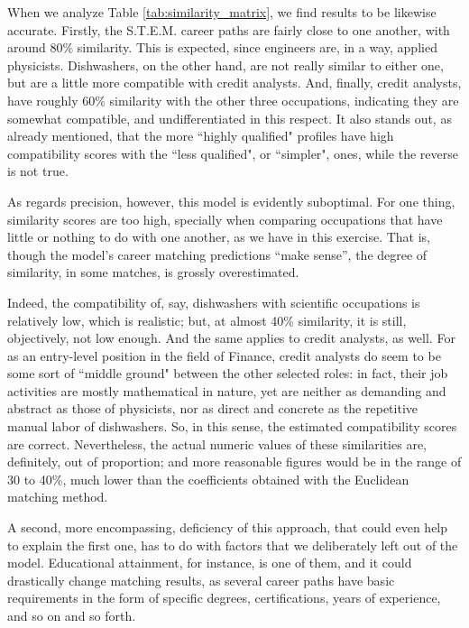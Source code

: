 \documentclass{article}
\begin{document}
When we analyze Table \ref{tab:similarity_matrix}, we find results to be
likewise accurate. Firstly, the S.T.E.M. career paths are fairly close to one
another, with around 80\% similarity. This is expected, since engineers are, in
a way, applied physicists. Dishwashers, on the other hand, are not really
similar to either one, but are a little more compatible with credit analysts.
And, finally, credit analysts, have roughly 60\% similarity with the other
three occupations, indicating they are somewhat compatible, and
undifferentiated in this respect. It also stands out, as already mentioned,
that the more ``highly qualified" profiles have high compatibility scores with
the ``less qualified", or ``simpler", ones, while the reverse is not true.

As regards precision, however, this model is evidently suboptimal. For one
thing, similarity scores are too high, specially when comparing occupations
that have little or nothing to do with one another, as we have in this
exercise. That is, though the model's career matching predictions ``make
sense'', the degree of similarity, in some matches, is grossly overestimated.

Indeed, the compatibility of, say, dishwashers with scientific occupations is
relatively low, which is realistic; but, at almost 40\% similarity, it is
still, objectively, not low enough. And the same applies to credit analysts, as
well. For as an entry-level position in the field of Finance, credit analysts
do seem to be some sort of ``middle ground" between the other selected roles:
in fact, their job activities are mostly mathematical in nature, yet are
neither as demanding and abstract as those of physicists, nor as direct and
concrete as the repetitive manual labor of dishwashers. So, in this sense, the
estimated compatibility scores are correct. Nevertheless, the actual numeric
values of these similarities are, definitely, out of proportion; and more
reasonable figures would be in the range of 30 to 40\%, much lower than the
coefficients obtained with the Euclidean matching method.

A second, more encompassing, deficiency of this approach, that could even help
to explain the first one, has to do with factors that we deliberately left out
of the model. Educational attainment, for instance, is one of them, and it
could drastically change matching results, as several career paths have basic
requirements in the form of specific degrees, certifications, years of
experience, and so on and so forth.
\end{document}
